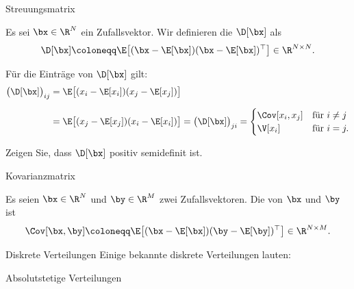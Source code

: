 \begin{frame}{Streuungsmatrix}{}
	\begin{mydef}
		Es sei $\bx \in \R^N$ ein Zufallsvektor. Wir definieren die  $\D[\bx]$ als
		\begin{equation*}
			\D[\bx] \coloneqq \E\bigl[ (\bx - \E[\bx]) (\bx - \E[\bx])^\top \bigr] \in \R^{N \times N}.
		\end{equation*}
	\end{mydef}

	Für die Einträge von $\D[\bx]$ gilt:
	\begin{align*}
		\bigl( \D[\bx] \bigr)_{ij}
			&= \E\bigl[ (x_i - \E[x_i]) (x_j - \E[x_j]) \bigr]
	\\[2mm]
			&= \E\bigl[ (x_j - \E[x_j]) (x_i - \E[x_i]) \bigr]
			= \bigl( \D[\bx] \bigr)_{ji} =
			\begin{cases}
				\Cov[x_i, x_j] & \text{für}\ i \ne j \\
				\V[x_i] & \text{für}\ i = j.
			\end{cases}
	\end{align*}

	\begin{mytask}
		Zeigen Sie, dass $\D[\bx]$ positiv semidefinit ist.
	\end{mytask}
\end{frame}


\begin{frame}{Kovarianzmatrix}{}
	\begin{mydef}
		Es seien $\bx \in \R^N$ und $\by \in \R^M$ zwei Zufallsvektoren. Die  von $\bx$ und $\by$ ist
		\begin{equation*}
			\Cov[\bx, \by] \coloneqq \E\bigl[ (\bx - \E[\bx]) (\by - \E[\by])^\top \bigr] \in \R^{N \times M}.
		\end{equation*} 
	\end{mydef}
\end{frame}


\begin{frame}{Diskrete Verteilungen}{}
	Einige bekannte diskrete Verteilungen lauten:
	
\end{frame}


\begin{frame}{Absolutstetige Verteilungen}{}
	
\end{frame}


